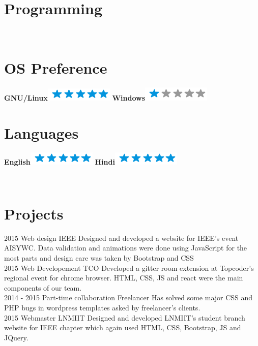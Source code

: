 \documentclass[]{friggeri-cv}
\begin{document}
\begin{aside}
  \section{Programming}
    ~
  \section{OS Preference}
    \textbf{GNU/Linux}\includegraphics[scale=0.40]{img/5stars.png}
    \textbf{Windows}\includegraphics[scale=0.40]{img/1stars.png}
    ~
  \section{Languages}
    \textbf{English}\includegraphics[scale=0.40]{img/5stars.png}
    \textbf{Hindi}\includegraphics[scale=0.40]{img/5stars.png}
    ~
\end{aside}
~
\section{ Projects}
\begin{entrylist}
  \entry
    {2015}
    {Web design}
    {IEEE}
    {Designed and developed a website for IEEE's event AISYWC. Data validation and animations were done using JavaScript for the most parts and design care was taken by Bootstrap and CSS \\}
  \entry
    {2015}
    {Web Developement}
    {TCO}
    {Developed a gitter room extension at Topcoder's regional event for chrome browser. HTML, CSS, JS and react were the main components of our team. \\}
    \entry
    {2014 - 2015}
    {Part-time collaboration}
    {Freelancer}
    {Has solved some major CSS and PHP bugs in wordpress templates asked by freelancer's clients. \\}
    \entry
    {2015}
    {Webmaster}
    {LNMIIT}
    {Designed and developed LNMIIT's student branch website for IEEE chapter which again used HTML, CSS, Bootstrap, JS and JQuery.}
\end{entrylist}
\\
\end{document}

